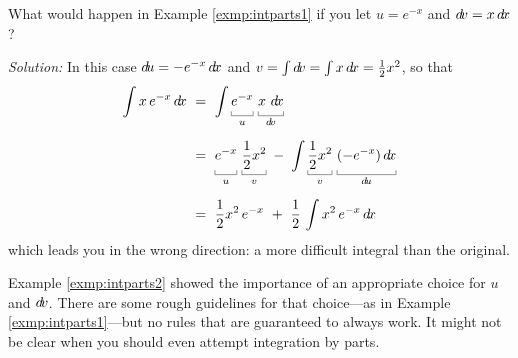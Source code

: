 \begin{exmp}\label{exmp:intparts2}
\noindent What would happen in Example \ref{exmp:intparts1} if you let
$u = e^{-x}$ and $d\!v = x\,d\!x$?\vspace{1mm}
\par\noindent\emph{Solution:} In this case $d\!u = -e^{-x}\,d\!x$ and
$v = \int d\!v = \int x\,d\!x = \frac{1}{2}x^2$, so that
\begin{align*}
\int x\,e^{-x}\,\dx ~&=~ \int \underbracket[0.3pt]{e^{-x}\vphantom{\tfrac{1}{2}}}_{u\vphantom{d}}\,\underbracket[0.3pt]{x~\dx\vphantom{\tfrac{1}{2}}}_{\dv}\\[6pt]
&=~ \underbracket[0.3pt]{e^{-x}\vphantom{\frac{1}{2}}}_{u\vphantom{d}}\,\underbracket[0.3pt]{\frac{1}{2}x^2}_{v\vphantom{d}} ~-~
 \int \underbracket[0.3pt]{\frac{1}{2}x^2}_{v\vphantom{d}}\,\underbracket[0.3pt]{(-e^{-x})\,\dx\vphantom{\frac{1}{2}}}_{\du}\\[6pt]
&=~ \frac{1}{2}x^2\,e^{-x} ~+~ \frac{1}{2}\,\int x^2\,e^{-x}\,\dx
\end{align*}
which leads you in the wrong direction: a more difficult integral than the
original.
\end{exmp}\vspace{-2mm}
\divider
\newpage
Example \ref{exmp:intparts2} showed the importance of an appropriate choice for
$u$ and $d\!v$. There are some rough guidelines for that choice---as in
Example \ref{exmp:intparts1}---but no rules that are guaranteed to always work.
It might not be clear when you should even attempt integration by parts.


